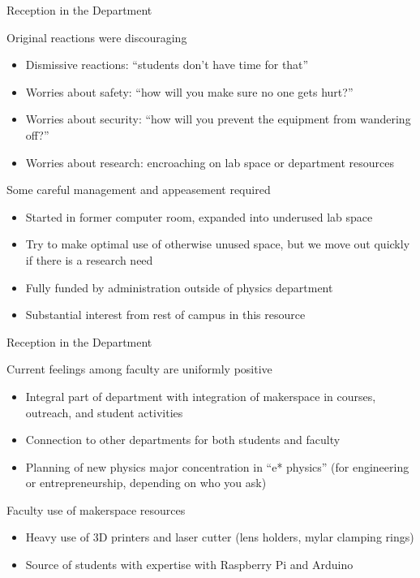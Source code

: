 \documentclass[xcolor=table,compress,professionalfonts,pdfpagelabels]{beamer}
\begin{document}
\begin{frame}{Reception in the Department}
 \begin{block}{Original reactions were discouraging}
  \begin{itemize}
   \item Dismissive reactions: ``students don't have time for that''
   \item Worries about safety: ``how will you make sure no one gets hurt?''
   \item Worries about security: ``how will you prevent the equipment from wandering off?''
   \item Worries about research: encroaching on lab space or department resources
  \end{itemize}
 \end{block}
 \begin{block}{Some careful management and appeasement required}
  \begin{itemize}
   \item Started in former computer room, expanded into underused lab space
   \item Try to make optimal use of otherwise unused space, but we move out quickly if there is a research need
   \item Fully funded by administration outside of physics department
   \item Substantial interest from rest of campus in this resource
  \end{itemize}
 \end{block}
\end{frame}
 
\begin{frame}{Reception in the Department}
 \begin{block}{Current feelings among faculty are uniformly positive}
  \begin{itemize}
   \item Integral part of department with integration of makerspace in courses, outreach, and student activities
   \item Connection to other departments for both students and faculty
   \item Planning of new physics major concentration in ``e* physics'' (for engineering or entrepreneurship, depending on who you ask)
  \end{itemize}
 \end{block}
 \begin{block}{Faculty use of makerspace resources}
  \begin{itemize}
   \item Heavy use of 3D printers and laser cutter (lens holders, mylar clamping rings)
   \item Source of students with expertise with Raspberry Pi and Arduino
  \end{itemize}
 \end{block}
\end{frame}
\end{document}
